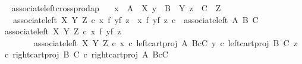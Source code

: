 \begin{isabellebody}
{\isafoldproof}%
%
\isadelimproof
\ \isanewline
%
\endisadelimproof
\isanewline
{}\isamarkupfalse%
\ associate{\isacharunderscore}{\kern0pt}left{\isacharunderscore}{\kern0pt}crossprod{\isacharunderscore}{\kern0pt}ap{\isacharcolon}{\kern0pt}\isanewline
\ \ \ {\isachardoublequoteopen}x\ {\isacharcolon}{\kern0pt}\ A\ {\isasymrightarrow}\ X{\isachardoublequoteclose}\ {\isachardoublequoteopen}y\ {\isacharcolon}{\kern0pt}\ B\ {\isasymrightarrow}\ Y{\isachardoublequoteclose}\ {\isachardoublequoteopen}z\ {\isacharcolon}{\kern0pt}\ C\ {\isasymrightarrow}\ Z{\isachardoublequoteclose}\isanewline
\ \ \ {\isachardoublequoteopen}associate{\isacharunderscore}{\kern0pt}left\ X\ Y\ Z\ {\isasymcirc}\isactrlsub c\ {\isacharparenleft}{\kern0pt}x\ {\isasymtimes}\isactrlsub f\ {\isacharparenleft}{\kern0pt}y{\isasymtimes}\isactrlsub f\ z{\isacharparenright}{\kern0pt}{\isacharparenright}{\kern0pt}\ {\isacharequal}{\kern0pt}\ {\isacharparenleft}{\kern0pt}{\isacharparenleft}{\kern0pt}x\ {\isasymtimes}\isactrlsub f\ y{\isacharparenright}{\kern0pt}{\isasymtimes}\isactrlsub f\ z{\isacharparenright}{\kern0pt}\ {\isasymcirc}\isactrlsub c\ \ associate{\isacharunderscore}{\kern0pt}left\ A\ B\ C{\isachardoublequoteclose}\isanewline
%
\isadelimproof
%
\endisadelimproof
%
\isatagproof
{}\isamarkupfalse%
{\isacharminus}{\kern0pt}\isanewline
\ \ \isamarkupfalse%
\ {\isachardoublequoteopen}associate{\isacharunderscore}{\kern0pt}left\ X\ Y\ Z\ {\isasymcirc}\isactrlsub c\ {\isacharparenleft}{\kern0pt}x\ {\isasymtimes}\isactrlsub f\ {\isacharparenleft}{\kern0pt}y{\isasymtimes}\isactrlsub f\ z{\isacharparenright}{\kern0pt}{\isacharparenright}{\kern0pt}\ {\isacharequal}{\kern0pt}\isanewline
\ \ \ \ \ \ \ \ associate{\isacharunderscore}{\kern0pt}left\ X\ Y\ Z\ {\isasymcirc}\isactrlsub c\ {\isasymlangle}x\ {\isasymcirc}\isactrlsub c\ left{\isacharunderscore}{\kern0pt}cart{\isacharunderscore}{\kern0pt}proj\ A\ {\isacharparenleft}{\kern0pt}B{\isasymtimes}\isactrlsub cC{\isacharparenright}{\kern0pt}{\isacharcomma}{\kern0pt}\ {\isasymlangle}y\ {\isasymcirc}\isactrlsub c\ left{\isacharunderscore}{\kern0pt}cart{\isacharunderscore}{\kern0pt}proj\ B\ C{\isacharcomma}{\kern0pt}\ z\ {\isasymcirc}\isactrlsub c\ right{\isacharunderscore}{\kern0pt}cart{\isacharunderscore}{\kern0pt}proj\ B\ C{\isasymrangle}\ {\isasymcirc}\isactrlsub c\ right{\isacharunderscore}{\kern0pt}cart{\isacharunderscore}{\kern0pt}proj\ A\ {\isacharparenleft}{\kern0pt}B{\isasymtimes}\isactrlsub cC{\isacharparenright}{\kern0pt}{\isasymrangle}{\isachardoublequoteclose}\isanewline

\end{isabellebody}
